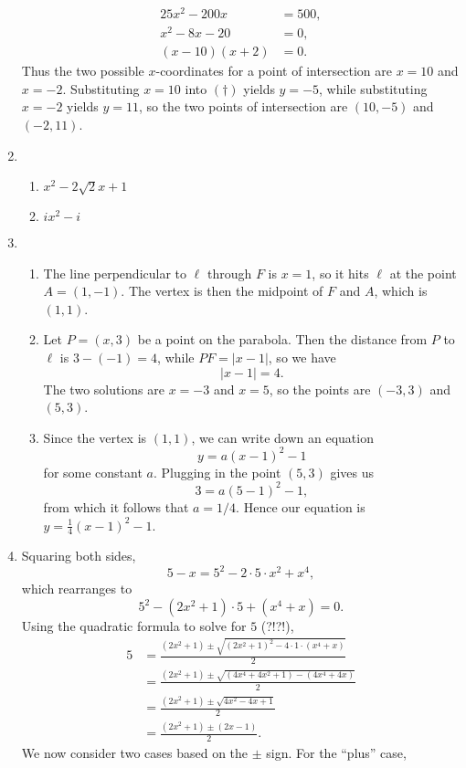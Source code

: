 \begin{enumerate}
\begin{align*}
25x^2 - 200x &= 500, \\
x^2 - 8x - 20 &= 0, \\
(x - 10)(x + 2) &= 0.
\end{align*}
Thus the two possible $x$-coordinates for a point of intersection are $x = 10$ and $x = -2$. Substituting $x = 10$ into $(\dagger)$ yields $y = -5$, while substituting $x = -2$ yields $y = 11$, so the two points of intersection are $\boxed{(10, -5)}$ and $\boxed{(-2, 11)}$.
\item \begin{enumerate}
\item $x^2 - 2\sqrt{2}x + 1$
\item $ix^2 - i$
\end{enumerate}
\item \begin{enumerate}
\item The line perpendicular to $\ell$ through $F$ is $x = 1$, so it hits $\ell$ at the point $A = (1,-1)$. The vertex is then the midpoint of $F$ and $A$, which is $\boxed{(1,1)}$.
\item Let $P = (x,3)$ be a point on the parabola. Then the distance from $P$ to $\ell$ is $3 - (-1) = 4$, while $PF = \lvert x - 1\rvert$, so we have
\begin{equation*}
\lvert x - 1\rvert = 4.
\end{equation*}
The two solutions are $x = -3$ and $x = 5$, so the points are $\boxed{(-3,3)}$ and $\boxed{(5,3)}$.
\item Since the vertex is $(1,1)$, we can write down an equation
\begin{equation*}
y = a(x - 1)^2 - 1
\end{equation*}
for some constant $a$. Plugging in the point $(5,3)$ gives us
\begin{equation*}
3 = a(5 - 1)^2 - 1,
\end{equation*}
from which it follows that $a = 1/4$. Hence our equation is $\boxed{y = \frac{1}{4}(x - 1)^2 - 1}$.
\end{enumerate}
\item Squaring both sides,
\begin{equation*}
5 - x = 5^2 - 2\cdot 5\cdot x^2 + x^4,
\end{equation*}
which rearranges to
\begin{equation*}
5^2 - (2x^2 + 1)\cdot 5 + (x^4 + x) = 0.
\end{equation*}
Using the quadratic formula to solve for $5$ (?!?!),
\begin{align*}
5 &= \frac{(2x^2 + 1)\pm\sqrt{(2x^2 + 1)^2 - 4\cdot 1\cdot (x^4 + x)}}{2} \\
&= \frac{(2x^2 + 1)\pm\sqrt{(4x^4 + 4x^2 + 1) - (4x^4 + 4x)}}{2} \\
&= \frac{(2x^2 + 1)\pm\sqrt{4x^2 - 4x + 1}}{2} \\
&= \frac{(2x^2 + 1)\pm (2x - 1)}{2}.
\end{align*}
We now consider two cases based on the $\pm$ sign. For the ``plus'' case,
\end{enumerate}